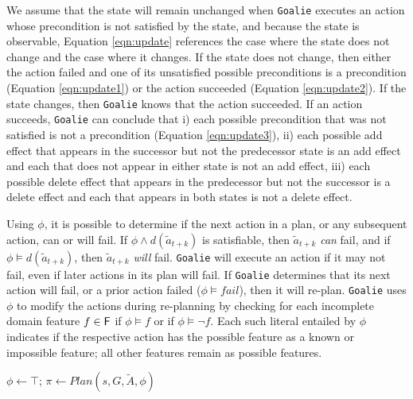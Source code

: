 \documentclass[letterpaper]{article}
\def\goalie{{\tt Goalie}}
\begin{document}
\noindent We assume that the state will remain unchanged when \goalie{} executes
an action whose precondition is not satisfied by the state, and because the
state is observable, Equation \ref{eqn:update} references the case where the
state does not change and the case where it changes.  If the state does not
change, then either the action failed and one of its unsatisfied possible
preconditions is a precondition (Equation \ref{eqn:update1}) or the action
succeeded (Equation \ref{eqn:update2}).  If the state changes, then \goalie{}
knows that the action succeeded.  If an action succeeds, \goalie{} can conclude
that i) each possible precondition that was not satisfied is not a precondition
(Equation \ref{eqn:update3}), ii) each possible add effect that appears in the
successor but not the predecessor state is an add effect and each that does not
appear in either state is not an add effect, iii) each possible delete effect
that appears in the predecessor but not the successor is a delete effect and
each that  appears in both states is not a delete effect.

Using $\phi$, it is possible to determine if the next action in a plan, or any
subsequent action, can or will fail.  If  $\phi \wedge d(\tilde{a}_{t+k})$ is
satisfiable, then $\tilde{a}_{t+k}$ {\em can} fail, and if $\phi \models
d(\tilde{a}_{t+k})$, then $\tilde{a}_{t+k}$ {\em will}  fail.  \goalie{} will
execute an action if it may not fail, even if later actions in its plan will
fail.  If \goalie{} determines that its next action will fail, or a prior action
failed ($\phi \models fail$), then it will re-plan.  \goalie{}  uses $\phi$ to
modify the actions during re-planning by checking for each incomplete domain
feature $f \in {\sf F}$ if $\phi \models f$ or if $\phi \models \neg f$.  Each
such literal entailed by $\phi$ indicates if the respective action has the
possible feature as a known or impossible feature; all other features remain as
possible features.



\begin{algorithm}[t]
\SetLine
{}
 $\phi \leftarrow \top$; $\pi \leftarrow Plan(s, G, \tilde{A}, \phi)$\;
\caption{\goalie{}$(s, G, \tilde{A})$}\label{alg:replan}
\end{algorithm}
\end{document}
